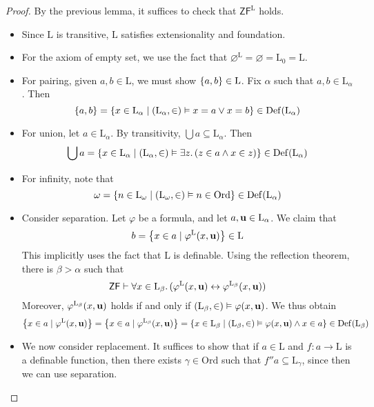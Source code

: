 \begin{proof}
    By the previous lemma, it suffices to check that \( \mathsf{ZF}^{\mathrm{L}} \) holds.
    \begin{itemize}
        \item Since \( \mathrm{L} \) is transitive, \( \mathrm{L} \) satisfies extensionality and foundation.
        \item For the axiom of empty set, we use the fact that \( \varnothing^{\mathrm{L}} = \varnothing = \mathrm{L}_0 = \mathrm{L} \).
        \item For pairing, given \( a, b \in \mathrm{L} \), we must show \( \qty{a, b} \in \mathrm{L} \).
        Fix \( \alpha \) such that \( a, b \in \mathrm{L}_\alpha \).
        Then
        \[ \qty{a, b} = \qty{x \in \mathrm{L}_\alpha \mid (\mathrm{L}_\alpha, \in) \vDash x = a \vee x = b} \in \operatorname{Def}(\mathrm{L}_\alpha) \]
        \item For union, let \( a \in \mathrm{L}_\alpha \).
        By transitivity, \( \bigcup a \subseteq \mathrm{L}_\alpha \).
        Then
        \[ \bigcup a = \qty{x \in \mathrm{L}_\alpha \mid (\mathrm{L}_\alpha, \in) \vDash \exists z.\, (z \in a \wedge x \in z)} \in \operatorname{Def}(\mathrm{L}_\alpha) \]
        \item For infinity, note that
        \[ \omega = \qty{n \in \mathrm{L}_\omega \mid (\mathrm{L}_\omega, \in) \vDash n \in \mathrm{Ord}} \in \operatorname{Def}(\mathrm{L}_\alpha) \]
        \item Consider separation.
        Let \( \varphi \) be a formula, and let \( a, \vb u \in \mathrm{L}_\alpha \).
        We claim that
        \[ b = \qty{x \in a \mid \varphi^{\mathrm{L}}(x, \vb u)} \in \mathrm{L} \]
        This implicitly uses the fact that \( \mathrm{L} \) is definable.
        Using the reflection theorem, there is \( \beta > \alpha \) such that
        \[ \mathsf{ZF} \vdash \forall x \in \mathrm{L}_\beta.\, (\varphi^{\mathrm{L}}(x, \vb u) \leftrightarrow \varphi^{\mathrm{L}_\beta}(x, \vb u)) \]
        Moreover, \( \varphi^{\mathrm{L}_\beta}(x, \vb u) \) holds if and only if \( (\mathrm{L}_\beta, \in) \vDash \varphi(x, \vb u) \).
        We thus obtain
        \[ \qty{x \in a \mid \varphi^{\mathrm{L}}(x, \vb u)} = \qty{x \in a \mid \varphi^{\mathrm{L}_\beta}(x, \vb u)} = \qty{x \in \mathrm{L}_\beta \mid (\mathrm{L}_\beta, \in) \vDash \varphi(x, \vb u) \wedge x \in a} \in \operatorname{Def}(\mathrm{L}_\beta) \]
        \item We now consider replacement.
        It suffices to show that if \( a \in \mathrm{L} \) and \( f : a \to \mathrm{L} \) is a definable function, then there exists \( \gamma \in \mathrm{Ord} \) such that \( f '' a \subseteq \mathrm{L}_\gamma \), since then we can use separation.

\end{itemize}
\end{proof}
